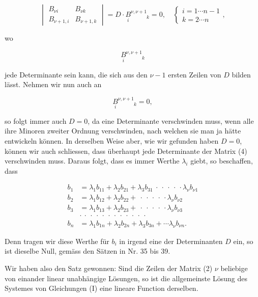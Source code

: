 \[
\begin{vmatrix} B_{\nu i} & B_{\nu k} \\ B_{\nu+1,i} & B_{\nu+1,k} \end{vmatrix}
= D\cdot \underset{i}{\overset{}{B}}{}^{\nu,\nu+1}_{\phantom{\nu,\nu+1}k} = 0,\quad
\begin{cases} i=1\cdots n-1 \\ k=2\cdots n \end{cases},
\]

wo

\[
\underset{i}{\overset{}{B}}{}^{\nu,\nu+1}_{\phantom{\nu,\nu+1}k}
\]

jede Determinante sein kann, die sich aus den $\nu-1$ ersten Zeilen von $D$ bilden l\"asst. Nehmen wir nun auch an

\[
\underset{i}{\overset{}{B}}{}^{\nu,\nu+1}_{\phantom{\nu,\nu+1}k} = 0,
\]

so folgt immer auch $D=0$, da eine Determinante verschwinden muss, wenn alle ihre Minoren zweiter Ordnung verschwinden, nach welchen sie man ja h\"atte entwickeln k\"onnen. In derselben Weise aber, wie wir gefunden haben $D=0$, k\"onnen wir auch schliessen, dass \"uberhaupt jede Determinante der Matrix (4) verschwinden muss. Daraus folgt, dass es immer Werthe $\lambda_i$ giebt, so beschaffen, dass

\[
\begin{aligned}
b_1 &= \lambda_1 b_{11} + \lambda_2 b_{21} + \lambda_3 b_{31}\ \cdot\ \cdot\ \cdot\ \cdot\ \cdot \lambda_\nu b_{\nu 1} \\
b_2 &= \lambda_1 b_{12} + \lambda_2 b_{22} + \ \cdot\ \cdot\ \cdot\ \cdot\ \cdot \lambda_\nu b_{\nu 2} \\
b_3 &= \lambda_1 b_{13} + \lambda_2 b_{23} + \ \cdot\ \cdot\ \cdot\ \cdot\ \cdot \lambda_\nu b_{\nu 3} \\
&\cdot\ \cdot\ \cdot\ \cdot\ \cdot\ \cdot\ \cdot\ \cdot\ \cdot\ \cdot\ \cdot\ \cdot \\
b_n &= \lambda_1 b_{1n} + \lambda_2 b_{2n} + \lambda_3 b_{3n} + \cdots \lambda_\nu b_{\nu n}.
\end{aligned}
\]

Denn tragen wir diese Werthe f\"ur $b_i$ in irgend eine der Determinanten $D$ ein, so ist dieselbe Null, gem\"ass den S\"atzen in Nr. 35 bis 39.

Wir haben also den Satz gewonnen: \glqq Sind die Zeilen der Matrix (2) $\nu$ beliebige von einander linear unabh\"angige L\"osungen, so ist die allgemeinste L\"osung des Systemes von Gleichungen (I) eine lineare Function derselben.\grqq{}

